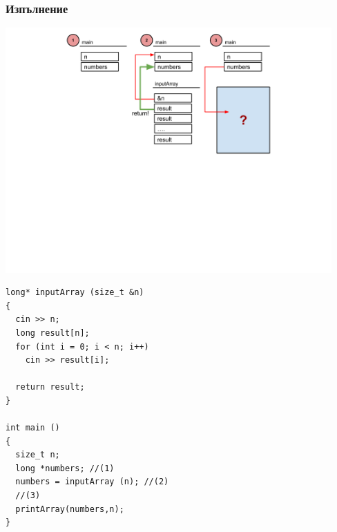 \documentclass{beamer}
\begin{document}
\begin{frame}[fragile]
\frametitle{Изпълнение}


\includegraphics[width=12.5cm]{images/stack}

\vspace{-200px}
\begin{flushleft}
\begin{lstlisting}
long* inputArray (size_t &n)
{ 
  cin >> n;
  long result[n];
  for (int i = 0; i < n; i++)
    cin >> result[i];

  return result;
}

int main ()
{
  size_t n;
  long *numbers; //(1)
  numbers = inputArray (n); //(2)
  //(3) 
  printArray(numbers,n);
}

\end{lstlisting}  
\end{flushleft}

\end{frame}
\end{document}
